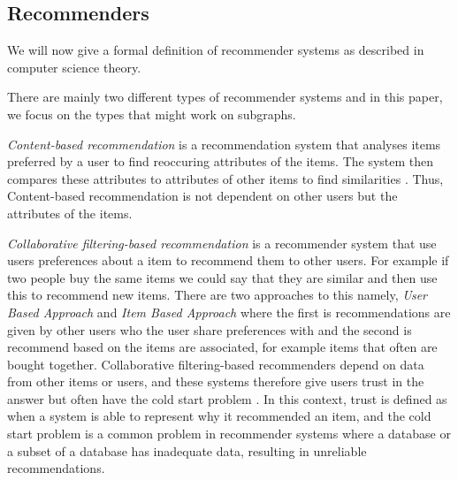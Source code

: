 \subsection{Recommenders}
\label{recommenders}
We will now give a formal definition of recommender systems as described in computer science theory.

There are mainly two different  types of recommender systems and in this paper, we focus on the types that might work on subgraphs.

\textit{Content-based recommendation} is a recommendation system that analyses items preferred by a user to find reoccuring attributes of the items. The system then compares these attributes to attributes of other items to find similarities \cite{lu2015recommender}. Thus, Content-based recommendation is not dependent on other users but the attributes of the items.

\textit{Collaborative filtering-based recommendation} is a recommender system that use users preferences about a item to recommend them to other users. For example if two people buy the same items we could say that they are similar and then use this to recommend new items. There are two approaches to this namely, \textit{User Based Approach} and \textit{Item Based Approach} where the first is recommendations are given by other users who the user share preferences with and the second is recommend based on the items are associated, for example items that often are bought together.
Collaborative filtering-based recommenders depend on data from other items or users, and these systems therefore give users trust in the answer but often have the cold start problem \cite{lu2015recommender}. In this context, trust is defined as when a system is able to represent why it recommended an item, and the cold start problem is a common problem in recommender systems where a database or a subset of a database has inadequate data, resulting in unreliable recommendations\cite{Ricci2015}.
